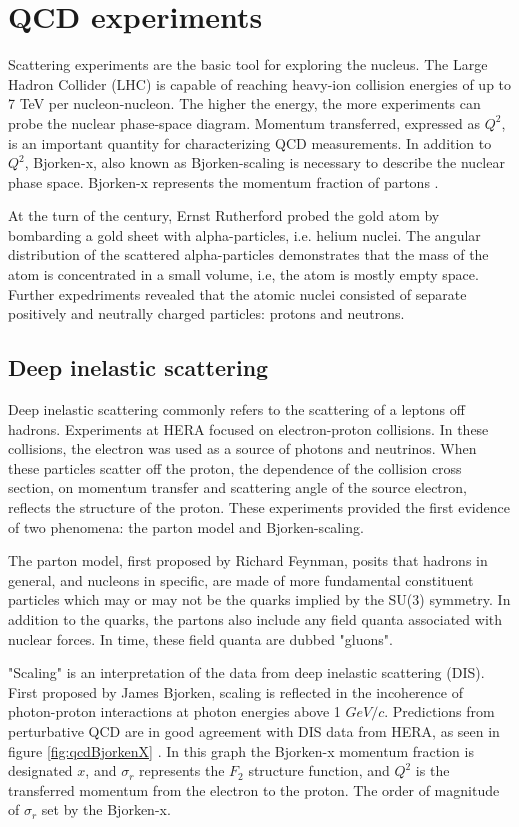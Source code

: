 \section{QCD experiments}

Scattering experiments are the basic tool for exploring the nucleus. The Large Hadron Collider (LHC) is capable of reaching heavy-ion collision energies of up to 7 TeV per nucleon-nucleon. The higher the energy, the more experiments can probe the nuclear phase-space diagram. Momentum transferred, expressed as $Q^2$, is an important quantity for characterizing QCD measurements. In addition to $Q^2$, Bjorken-x, also known as Bjorken-scaling is necessary to describe the nuclear phase space. Bjorken-x represents the momentum fraction of partons \cite{Bjorken:1968dy}. 

At the turn of the century, Ernst Rutherford probed the gold atom by bombarding a gold sheet with alpha-particles, i.e. helium nuclei. The angular distribution of the scattered alpha-particles demonstrates that the mass of the atom is concentrated in a small volume, i.e, the atom is mostly empty space. Further expedriments revealed that the atomic nuclei consisted of separate positively and neutrally charged particles: protons and neutrons. 

\subsection{Deep inelastic scattering}

Deep inelastic scattering commonly refers to the scattering of a leptons off hadrons. Experiments at HERA focused on electron-proton collisions. In these collisions, the electron was used as a source of photons and neutrinos. When these particles scatter off the proton, the dependence of the collision cross section, on momentum transfer and scattering angle of the source electron, reflects the structure of the proton. These experiments provided the first evidence of two phenomena: the parton model and Bjorken-scaling. 

The parton model, first proposed by Richard Feynman, posits that hadrons in general, and nucleons in specific, are made of more fundamental constituent particles which may or may not be the quarks implied by the SU(3) symmetry. In addition to the quarks, the partons also include any field quanta associated with nuclear forces. In time, these field quanta are dubbed "gluons".

"Scaling" is an interpretation of the data from deep inelastic scattering (DIS). First proposed by James Bjorken, scaling is reflected in the incoherence of photon-proton interactions at photon energies above 1 $GeV/c$. Predictions from perturbative QCD are in good agreement with DIS data from HERA, as seen in figure \ref{fig:qcdBjorkenX} \cite{Shimizu:2009fc}. In this graph the Bjorken-x momentum fraction is designated $x$, and $\sigma_r$ represents the $F_2$ structure function, and $Q^2$ is the transferred momentum from the electron to the proton. The order of magnitude of $\sigma_r$ set by the Bjorken-x.

